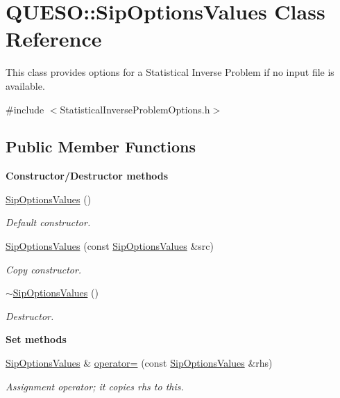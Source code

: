 \hypertarget{class_q_u_e_s_o_1_1_sip_options_values}{\section{Q\-U\-E\-S\-O\-:\-:Sip\-Options\-Values Class Reference}
\label{class_q_u_e_s_o_1_1_sip_options_values}
}


This class provides options for a Statistical Inverse Problem if no input file is available.  




{\ttfamily \#include $<$Statistical\-Inverse\-Problem\-Options.\-h$>$}

\subsection*{Public Member Functions}
\begin{Indent}{\bf Constructor/\-Destructor methods}\par
\begin{DoxyCompactItemize}
\item 
\hyperlink{class_q_u_e_s_o_1_1_sip_options_values_ae1758de20f5e2c05447e821b12c91139}{Sip\-Options\-Values} ()
\begin{DoxyCompactList}\small\item\em Default constructor. \end{DoxyCompactList}\item 
\hyperlink{class_q_u_e_s_o_1_1_sip_options_values_ade0d13814c57e5121b803ce06d3584b5}{Sip\-Options\-Values} (const \hyperlink{class_q_u_e_s_o_1_1_sip_options_values}{Sip\-Options\-Values} \&src)
\begin{DoxyCompactList}\small\item\em Copy constructor. \end{DoxyCompactList}\item 
\hyperlink{class_q_u_e_s_o_1_1_sip_options_values_aff12acaaae65cba11020522126e0fd8f}{$\sim$\-Sip\-Options\-Values} ()
\begin{DoxyCompactList}\small\item\em Destructor. \end{DoxyCompactList}\end{DoxyCompactItemize}
\end{Indent}
\begin{Indent}{\bf Set methods}\par
\begin{DoxyCompactItemize}
\item 
\hyperlink{class_q_u_e_s_o_1_1_sip_options_values}{Sip\-Options\-Values} \& \hyperlink{class_q_u_e_s_o_1_1_sip_options_values_abb893847a1358ffe904c47ed16cb4178}{operator=} (const \hyperlink{class_q_u_e_s_o_1_1_sip_options_values}{Sip\-Options\-Values} \&rhs)
\begin{DoxyCompactList}\small\item\em Assignment operator; it copies {\ttfamily rhs} to {\ttfamily this}. \end{DoxyCompactList}\end{DoxyCompactItemize}
\end{Indent}
